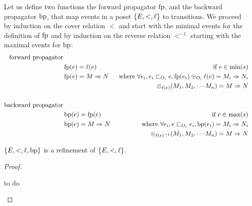 \begin{definition}
  Let us define two functions the forward propagator $\operatorname{fp}$, and the backward propagator $\operatorname{bp}$, that map events in a poset $\{E,<,\ell\}$ to transitions.
We proceed by induction on the cover relation $<$ and start with the minimal events for the definition of $\operatorname{fp}$ and by induction on the reverse relation $<^{-1}$ starting with the maximal events for $\operatorname{bp}$:
\begin{align*}
  \text{forward propagator}\\
  &\operatorname{fp}(e) = \ell(e)&\text{ if }e\in\text{min}(s)\\
  &\operatorname{fp}(e) = M\Rightarrow N&\text{ where }\forall e_i, e_i\sqsubset_{O_i}e, \operatorname{fp}(e_i)\oplus_{O_i}\ell(e) = M_i\Rightarrow N_i\\
  &&\otimes_{\ell(e)}(M_1, M_2, \cdots M_n) = M \Rightarrow N\\
  \\
  \text{backward propagator}\\
  &\operatorname{bp}(e) = \operatorname{fp}(e)&\text{ if }e\in\text{max}(s)\\
  &\operatorname{bp}(e) = M\Rightarrow N&\text{ where }\forall e_i, e\sqsubset_{O_i}e_i, \operatorname{bp}(e_i) = M_i\Rightarrow N_i\\
  &&\otimes_{\ell(e)^{-1}}(M_1, M_2, \cdots M_n) = M \Rightarrow N
\end{align*}
\end{definition}

\begin{lemma}
  $\{E, <,\ell, \operatorname{bp}\}$ is a refinement of $\{E, <,\ell\}$.
\end{lemma}
\begin{proof}
  \begin{mdframed}[backgroundcolor=blue!20]
    to do
  \end{mdframed}
\end{proof}




